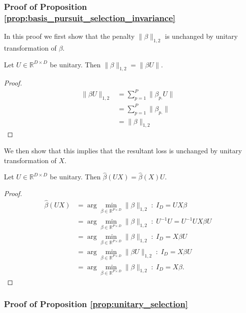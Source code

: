 \subsubsection{Proof of Proposition \ref{prop:basis_pursuit_selection_invariance}}
\label{proof:basis_pursuit_program_invariance}

In this proof we first show that the penalty $\|\beta\|_{1,2}$ is unchanged by unitary transformation of $\beta$.

 \begin{proposition}
 \label{prop:basis_pursuit_loss_equivalence}
 Let $U \in \mathbb R^{D \times D}$ be unitary.
 Then $\|\beta\|_{1,2} = \|\beta U \|$.
\end{proposition}

\begin{proof}
\begin{align}
\|\beta U \|_{1,2} &= \sum_{p = 1}^P \| \beta_{p.} U \| \\
&= \sum_{p = 1}^P \| \beta_{p.} \| \\
&= \|\beta \|_{1,2}
\end{align}
\end{proof}

We then show that this implies that the resultant loss is unchanged by unitary transformation of $ X$.

\begin{proposition}
 \label{prop:basis_pursuit_loss_equivalence}
 Let $U \in \mathbb R^{D \times D}$ be unitary.
 Then $\widehat \beta  (U  X) = \widehat \beta  (  X) U$.
\end{proposition}

\begin{proof}
\begin{align}
\widehat \beta  (U  X)  &= \arg \min_{\beta \in \mathbb R^{P \times D}} \|\beta\|_{1,2}  \; : \; I_{D} = U X \beta \\
&= \arg \min_{\beta \in \mathbb R^{P \times D}} \|\beta\|_{1,2}  \; : \; U^{-1} U = U^{-1} U X \beta U \\
&= \arg \min_{\beta \in \mathbb R^{P \times D}} \|\beta\|_{1,2}  \; : \;  I_D = X \beta U \\
&= \arg \min_{\beta \in \mathbb R^{P \times D}} \|\beta U \|_{1,2}  \; : \;  I_D = X \beta U \\
&= \arg \min_{\beta \in \mathbb R^{P \times D}} \|\beta \|_{1,2}  \; : \;  I_D = X \beta.
\end{align}
\end{proof}

\subsubsection{Proof of Proposition \ref{prop:unitary_selection}}
\label{proof:unitary_selection}

